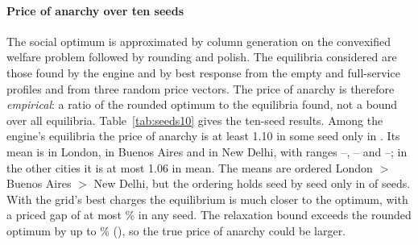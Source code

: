 \documentclass[preprint,11pt]{elsarticle}
\theoremstyle{definition}
\theoremstyle{remark}
\begin{document}
\paragraph{Price of anarchy over ten seeds} The social optimum is approximated by column generation on the convexified welfare problem followed by rounding and polish. The equilibria considered are those found by the engine and by best response from the empty and full-service profiles and from three random price vectors. The price of anarchy is therefore \emph{empirical}: a ratio of the rounded optimum to the equilibria found, not a bound over all equilibria. Table~\ref{tab:seeds10} gives the ten-seed results. Among the engine's equilibria the price of anarchy is at least 1.10 in some seed only in \TenPoaHiCities. Its mean is \TenPoaLondon{} in London, \TenPoaBuenosAires{} in Buenos Aires and \TenPoaNewDelhi{} in New Delhi, with ranges \TenPoaMinLondon--\TenPoaMaxLondon{}, \TenPoaMinBuenosAires--\TenPoaMaxBuenosAires{} and \TenPoaMinNewDelhi--\TenPoaMaxNewDelhi{}; in the other cities it is at most 1.06 in mean. The means are ordered London $>$ Buenos Aires $>$ New Delhi, but the ordering holds seed by seed only in \TenPoaOrderAll{} of \TenPoaOrderN{} seeds. With the grid's best charges the equilibrium is much closer to the optimum, with a priced gap of at most \TenPricedGapMax\% in any seed. The relaxation bound exceeds the rounded optimum by up to \SObound\% (\SOboundCity), so the true price of anarchy could be larger.

\begin{table}[tbp]\centering\small
\caption{Ten-seed summary (exact oracle). $n_{\rm eq}$, $n_{\rm grid}$: seeds for the equilibrium quantities and for grid-derived quantities; $^*$: reduced exact grid, grid quantities are lower bounds. PoA of the engine's equilibrium, mean with bootstrap 95\% CI. Gains are \% of $|$social cost$|$ of the best exact grid point with the congestion charge only or the delivery charge only: mean (maximum over seeds). Delivery share: delivery-only gain over the combined gain per seed. Priced gap: shortfall of the equilibrium under the grid's best charges from the rounded optimum, \%.}\label{tab:seeds10}
\end{table}
\end{document}
